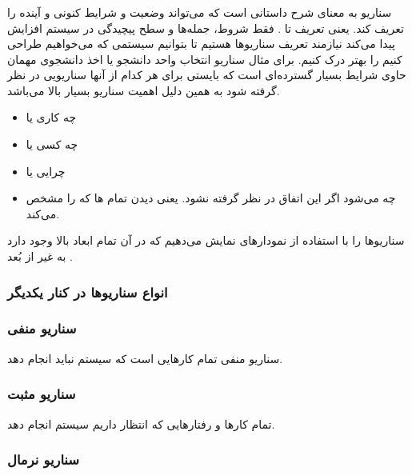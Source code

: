 \subsubsection{}

سناریو به معنای شرح داستانی است که می‌تواند وضعیت و شرایط کنونی و آینده را تعریف
کند. یعنی تعریف  تا . فقط شروط، جمله‌ها و سطح
پیچیدگی در سیستم افزایش پیدا می‌کند نیازمند تعریف سناریو‌ها هستیم تا بتوانیم
سیستمی که می‌خواهیم طراحی کنیم را بهتر درک کنیم. برای مثال سناریو انتخاب واحد
دانشجو یا اخذ دانشجوی مهمان حاوی شرایط بسیار گسترده‌ای است که بایستی برای هر
کدام از آنها سناریویی در نظر گرفته شود به همین دلیل اهمیت سناریو بسیار بالا
می‌باشد.

\begin{itemize}
    \item چه کاری یا 
    \item چه کسی یا 
    \item چرایی یا 
    \item چه می‌شود اگر این اتفاق در نظر گرفته نشود. یعنی دیدن تمام
    ها که  را مشخص می‌کند.
\end{itemize}

سناریو‌ها را با استفاده از نمودار‌های  نمایش می‌دهیم که در آن تمام
ابعاد بالا وجود دارد به غیر از بُعد .

\subsubsection*{انواع سناریو‌ها در کنار یکدیگر}

\subsubsection*{سناریو منفی}

سناریو منفی تمام کار‌هایی است که سیستم نباید انجام دهد.

\subsubsection*{سناریو مثبت}

تمام کار‌ها و رفتار‌هایی که انتظار داریم سیستم انجام دهد.

\subsubsection*{سناریو نرمال}

